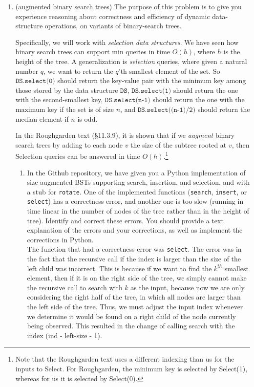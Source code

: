 \documentclass[11pt]{article}
\begin{document}
\begin{enumerate}
    \newpage

    
    \item (augmented binary search trees) The purpose of this problem is to give you experience reasoning about correctness and efficiency of dynamic data-structure operations, on variants of binary-search trees. 
    
    Specifically, we will work with {\em selection data structures}.
    We have seen how binary search trees can support min queries in time $O(h)$, where $h$ is the height of the tree.  A generalization is {\em selection} queries, where given a natural number $q$, we want to return the $q$'th smallest element of the set.  So $\texttt{DS.select(0)}$ should return the key-value pair with the minimum key among those stored by the data structure $\texttt{DS}$, $\texttt{DS.select(1)}$ should return the one with the second-smallest key, $\texttt{DS.select(n-1)}$ should return the one with the maximum key if the set is of size $n$, and $\texttt{DS.select((n-1)/2)}$ should return the median element if $n$ is odd.
    
    In the Roughgarden text (\S11.3.9), it is shown that if we {\em augment} binary search trees by adding to each node $v$ the size of the subtree rooted at $v$, then Selection queries can be answered in time $O(h)$.\footnote{Note that the Roughgarden text uses a different indexing than us for the inputs to Select. For Roughgarden, the minimum key is selected by Select(1), whereas for us it is selected by Select(0).}
    
    \begin{enumerate}
        \item In the Github repository, we have given you a Python implementation of size-augmented BSTs supporting search, insertion, and selection, and with a stub for \texttt{rotate}. One of the implemented functions (\texttt{search}, \texttt{insert}, or \texttt{select}) has a correctness error, and another one is too slow (running in time linear in the number of nodes of the tree rather than in the height of tree). Identify and correct these errors. You should provide a text explanation of the errors and your corrections, as well as implement the corrections in Python. \\
        
        The function that had a correctness error was \texttt{select}. The error was in the fact that the recursive call if the index is larger than the size of the left child was incorrect. This is because if we want to find the $k^{th}$ smallest element, then if it is on the right side of the tree, we simply cannot make the recursive call to search with $k$ as the input, because now we are only considering the right half of the tree, in which all nodes are larger than the left side of the tree. Thus, we must adjust the input index whenever we determine it would be found on a right child of the node currently being observed. This resulted in the change of calling search with the index (ind - left-size - 1). \\
        

\end{enumerate}
\end{enumerate}
\end{document}
